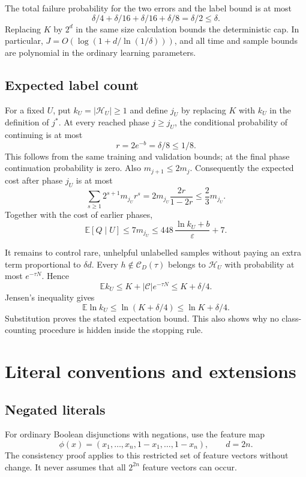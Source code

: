 \documentclass[11pt,a4paper]{article}
\newcommand{\C}{\mathcal C}
\newcommand{\HU}{\mathcal H_U}
\newcommand{\E}{\mathbb E}
\begin{document}
The total failure probability for the two errors and the label bound is
at most
\[
 \delta/4+\delta/16+\delta/16+\delta/8=\delta/2\le\delta.
\]
Replacing \(K\) by \(2^d\) in the same size calculation bounds the
deterministic cap. In particular,
\(J=O(\log(1+d/\ln(1/\delta)))\), and all time and sample bounds are
polynomial in the ordinary learning parameters.

\subsection{Expected label count}

For a fixed \(U\), put \(k_U=|\HU|\ge1\) and define \(j_U\) by replacing
\(K\) with \(k_U\) in the definition of \(j^*\). At every reached phase
\(j\ge j_U\), the conditional probability of continuing is at most
\[
 r=2e^{-b}=\delta/8\le1/8.
\]
This follows from the same training and validation bounds; at the final
phase continuation probability is zero. Also \(m_{j+1}\le2m_j\).
Consequently the expected cost after phase \(j_U\) is at most
\[
 \sum_{s\ge1}2^{s+1}m_{j_U}r^s
 =2m_{j_U}\frac{2r}{1-2r}\le\frac23m_{j_U}.
\]
Together with the cost of earlier phases,
\[
 \E[Q\mid U]\le7m_{j_U}
 \le448\,\frac{\ln k_U+b}{\varepsilon}+7.
\]

It remains to control rare, unhelpful unlabelled samples without paying
an extra term proportional to \(\delta d\).
Every \(h\notin\C_D(\tau)\) belongs to \(\HU\) with probability at most
\(e^{-\tau N}\). Hence
\[
 \E k_U\le K+|\C|e^{-\tau N}\le K+\delta/4.
\]
Jensen's inequality gives
\[
 \E\ln k_U\le\ln(K+\delta/4)\le\ln K+\delta/4.
\]
Substitution proves the stated expectation bound. This also shows why no
class-counting procedure is hidden inside the stopping rule.

\section{Literal conventions and extensions}\label{sec:literals}

\subsection{Negated literals}

For ordinary Boolean disjunctions with negations, use the feature map
\[
 \phi(x)=(x_1,\ldots,x_n,1-x_1,\ldots,1-x_n),
 \qquad d=2n.
\]
The consistency proof applies to this restricted set of feature vectors
without change. It never assumes that all \(2^{2n}\) feature vectors can
occur.
\end{document}
